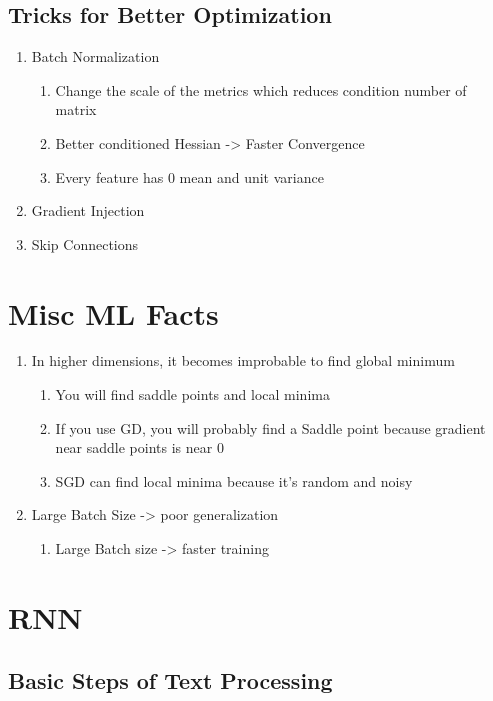 \documentclass[11pt]{article}
\begin{document}
\subsection{Tricks for Better Optimization}
\label{sec:org8e7236a}

\begin{enumerate}
\item Batch Normalization
\begin{enumerate}
\item Change the scale of the metrics which reduces condition number of matrix
\item Better conditioned Hessian -> Faster Convergence
\item Every feature has 0 mean and unit variance
\end{enumerate}
\item Gradient Injection
\item Skip Connections
\end{enumerate}

\section{Misc ML Facts}
\label{sec:orgbed4260}

\begin{enumerate}
\item In higher dimensions, it becomes improbable to find global minimum
\begin{enumerate}
\item You will find saddle points and local minima
\item If you use GD, you will probably find a Saddle point because gradient near saddle points is near 0
\item SGD can find local minima because it's random and noisy
\end{enumerate}
\item Large Batch Size -> poor generalization
\begin{enumerate}
\item Large Batch size -> faster training
\end{enumerate}
\end{enumerate}

\section{RNN}
\label{sec:org7618528}

\subsection{Basic Steps of Text Processing}
\label{sec:orged3d45f}
\end{document}
